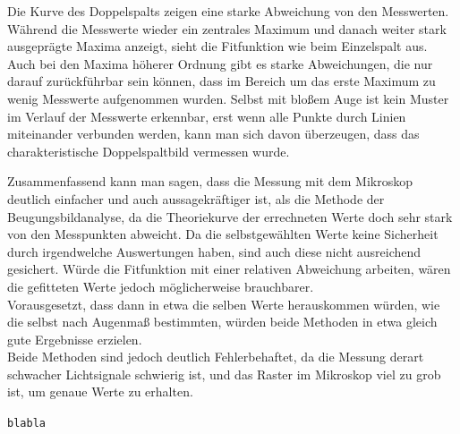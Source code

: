 Die Kurve des Doppelspalts zeigen eine starke Abweichung von den Messwerten. Während die Messwerte wieder ein zentrales Maximum und danach weiter stark ausgeprägte Maxima anzeigt, sieht die Fitfunktion wie beim Einzelspalt aus. Auch bei den Maxima höherer Ordnung gibt es starke Abweichungen, die nur darauf zurückführbar sein können, dass im Bereich um das erste Maximum zu wenig Messwerte aufgenommen wurden. Selbst mit bloßem Auge ist kein Muster im Verlauf der Messwerte erkennbar, erst wenn alle Punkte durch Linien miteinander verbunden werden, kann man sich davon überzeugen, dass das charakteristische Doppelspaltbild vermessen wurde.

Zusammenfassend kann man sagen, dass die Messung mit dem Mikroskop deutlich einfacher und auch aussagekräftiger ist, als die Methode der Beugungsbildanalyse, da die Theoriekurve der errechneten Werte doch sehr stark von den Messpunkten abweicht. Da die selbstgewählten Werte keine Sicherheit durch irgendwelche Auswertungen haben, sind auch diese nicht ausreichend gesichert. Würde die Fitfunktion mit einer relativen Abweichung arbeiten, wären die gefitteten Werte jedoch  möglicherweise brauchbarer.\\

Vorausgesetzt, dass dann in etwa die selben Werte herauskommen würden, wie die selbst nach Augenmaß bestimmten, würden beide Methoden in etwa gleich gute Ergebnisse erzielen.\\
Beide Methoden sind jedoch deutlich Fehlerbehaftet, da die Messung derart schwacher Lichtsignale schwierig ist, und das Raster im Mikroskop viel zu grob ist, um genaue Werte zu erhalten.


\tt{blabla}




